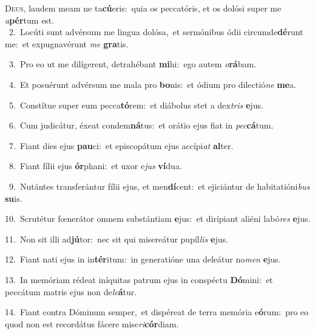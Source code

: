 \lettrine{\initial\textcolor{\initialcolor}{D}}{eus,} laudem meam ne ta\-\textbf{cú}\-eris:~\star quia os peccatóris, et os dolósi super me \textit{a}\-\textbf{pér}tum est.\\
{\numbfont\textcolor{\numbcolor}{~2.}}~Locúti sunt advérsum me lingua dolósa,~\dagger et sermónibus ódii circumde\-\textbf{dé}\-runt me:~\star et expugnavérunt \textit{me} \textbf{gra}\-tis.\par
{\numbfont\textcolor{\numbcolor}{~3.}}~Pro eo ut me dilígerent, detrahébant \textbf{mi}\-hi:~\star ego autem \textit{o}\-\textbf{rá}bam.\par
{\numbfont\textcolor{\numbcolor}{~4.}}~Et posuérunt advérsum me mala pro \textbf{bo}\-nis:~\star et ódium pro dilectió\textit{ne} \textbf{me}\-a.\par
{\numbfont\textcolor{\numbcolor}{~5.}}~Constítue super eum pecca\-\textbf{tó}\-rem:~\star et diábolus stet a dex\textit{tris} \textbf{e}\-jus.\par
{\numbfont\textcolor{\numbcolor}{~6.}}~Cum judicátur, éxeat condem\-\textbf{ná}\-tus:~\star et orátio ejus fiat in \textit{pec}\-\textbf{cá}tum.\par
{\numbfont\textcolor{\numbcolor}{~7.}}~Fiant dies ejus \textbf{pau}\-ci:~\star et episcopátum ejus accípi\textit{at} \textbf{al}\-ter.\par
{\numbfont\textcolor{\numbcolor}{~8.}}~Fiant fílii ejus \textbf{ór}\-phani:~\star et uxor e\textit{jus} \textbf{ví}\-dua.\par
{\numbfont\textcolor{\numbcolor}{~9.}}~Nutántes transferántur fílii ejus, et men\-\textbf{dí}\-cent:~\star et ejiciántur de habitatióni\textit{bus} \textbf{su}\-is.\par
{\numbfont\textcolor{\numbcolor}{10.}}~Scrutétur fœnerátor omnem substántiam \textbf{e}\-jus:~\star et dirípiant aliéni labó\textit{res} \textbf{e}\-jus.\par
{\numbfont\textcolor{\numbcolor}{11.}}~Non sit illi ad\-\textbf{jú}\-tor:~\star nec sit qui misereátur pupíl\textit{lis} \textbf{e}\-jus.\par
{\numbfont\textcolor{\numbcolor}{12.}}~Fiant nati ejus in in\-\textbf{tér}\-itum:~\star in generatióne una deleátur no\textit{men} \textbf{e}\-jus.\par
{\numbfont\textcolor{\numbcolor}{13.}}~In memóriam rédeat iníquitas patrum ejus in conspéctu \textbf{Dó}\-mini:~\star et peccátum matris ejus non de\-\textit{le}\-\textbf{á}tur.\par
{\numbfont\textcolor{\numbcolor}{14.}}~Fiant contra Dóminum semper,~\dagger et dispéreat de terra memória e\-\textbf{ó}\-rum:~\star pro eo quod non est recordátus fácere mise\-\textit{ri}\-\textbf{cór}diam.\par
